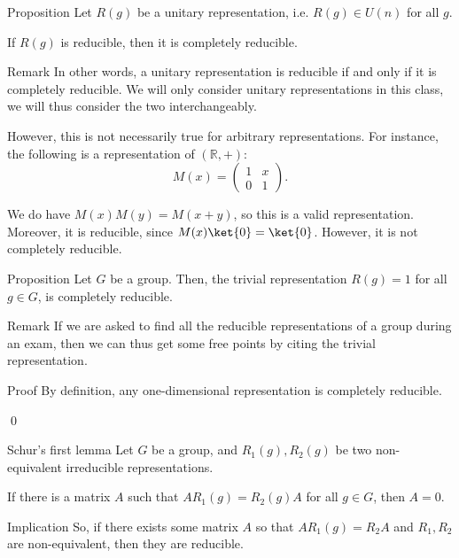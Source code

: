 \documentclass[a4paper]{article}
\begin{document}
\begin{parag}{Proposition}
    Let $R\left(g\right)$ be a unitary representation, i.e. $R\left(g\right) \in U\left(n\right)$ for all $g$.

    If $R\left(g\right)$ is reducible, then it is completely reducible.

    \begin{subparag}{Remark}
        In other words, a unitary representation is reducible if and only if it is completely reducible. We will only consider unitary representations in this class, we will thus consider the two interchangeably.

        However, this is not necessarily true for arbitrary representations. For instance, the following is a representation of $\left(\mathbb{R}, +\right)$: 
        \[M\left(x\right) = \begin{pmatrix} 1 & x \\ 0 & 1 \end{pmatrix}.\]

        We do have $M\left(x\right)M\left(y\right) = M\left(x + y\right)$, so this is a valid representation. Moreover, it is reducible, since $M\left(x\right) \ket{0} = \ket{0}$. However, it is not completely reducible.
    \end{subparag}
\end{parag}

\begin{parag}{Proposition}
    Let $G$ be a group. Then, the trivial representation $R\left(g\right) = 1$ for all $g \in G$, is completely reducible.

    \begin{subparag}{Remark}
        If we are asked to find all the reducible representations of a group during an exam, then we can thus get some free points by citing the trivial representation.
    \end{subparag}

    \begin{subparag}{Proof}
        By definition, any one-dimensional representation is completely reducible.

        \qed
    \end{subparag}
\end{parag}

\begin{parag}{Schur's first lemma}
    Let $G$ be a group, and $R_1\left(g\right),R_2\left(g\right)$ be two non-equivalent irreducible representations. 

    If there is a matrix $A$ such that $A R_1\left(g\right) = R_2\left(g\right) A$ for all $g \in G$, then $A = 0$.

    \begin{subparag}{Implication}
        So, if there exists some matrix $A$ so that $A R_1\left(g\right) = R_2 A$ and $R_1, R_2$ are non-equivalent, then they are reducible.
    \end{subparag}
\end{parag}
\end{document}
